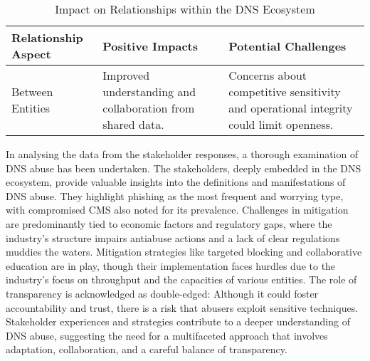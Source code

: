 {

\begin{table}[H]
\centering
\footnotesize 
\begin{tabular}{|l|p{4cm}|p{4cm}|}
\hline
\cellcolor{gray!50}\textbf{Relationship Aspect} & \cellcolor{gray!50}\textbf{Positive Impacts} & \cellcolor{gray!50}\textbf{Potential Challenges} \\
\hline
Between Entities & Improved understanding and collaboration from shared data. & Concerns about competitive sensitivity and operational integrity could limit openness. \\
\hline
\end{tabular}
\caption{Impact on Relationships within the DNS Ecosystem}
\label{table:impact_on_relationships}
\end{table}
}

In analysing the data from the stakeholder responses, a thorough examination of DNS abuse has been undertaken. The stakeholders, deeply embedded in the DNS ecosystem, provide valuable insights into the definitions and manifestations of DNS abuse. They highlight phishing as the most frequent and worrying type, with compromised CMS also noted for its prevalence. Challenges in mitigation are predominantly tied to economic factors and regulatory gaps, where the industry's structure impairs antiabuse actions and a lack of clear regulations muddies the waters. Mitigation strategies like targeted blocking and collaborative education are in play, though their implementation faces hurdles due to the industry's focus on throughput and the capacities of various entities. The role of transparency is acknowledged as double-edged: Although it could foster accountability and trust, there is a risk that abusers exploit sensitive techniques. Stakeholder experiences and strategies contribute to a deeper understanding of DNS abuse, suggesting the need for a multifaceted approach that involves adaptation, collaboration, and a careful balance of transparency.

